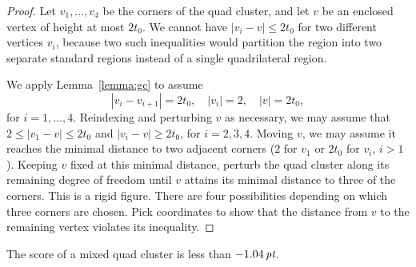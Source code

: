 \begin{proof} Let $v_1,\ldots,v_4$ be the corners of the quad cluster, and let
$v$ be an enclosed vertex of height at most $2t_0$. We cannot have
$|v_i-v|\le2t_0$ for two different vertices $v_i$,  because two
such inequalities would partition the region into two separate
standard regions instead of a single quadrilateral region.

We apply Lemma~\ref{lemma:gc} to assume
    $$|v_i-v_{i+1}|=2t_0,\quad |v_i|=2, \quad |v|=2t_0,$$
for $i=1,\ldots,4$. Reindexing and perturbing $v$ as necessary, we
may assume that $2\le |v_1-v|\le2t_0$ and $|v_i-v|\ge2t_0$, for
$i=2,3,4$. Moving $v$, we may assume it reaches the minimal
distance to two adjacent corners ($2$ for $v_1$ or $2t_0$ for
$v_i$, $i>1$).  Keeping $v$ fixed at this minimal distance,
perturb the quad cluster along its remaining degree of freedom
until $v$ attains its minimal distance to three of the corners.
This is a rigid figure.  There are four possibilities depending on
which three corners are chosen. Pick coordinates to show that the
distance from $v$ to the remaining vertex violates its inequality.
\end{proof}

\begin{lemma} \label{lemma:1.04}
The score of a mixed quad cluster is less than $-1.04\,\hbox{\it pt}$.
\end{lemma}

